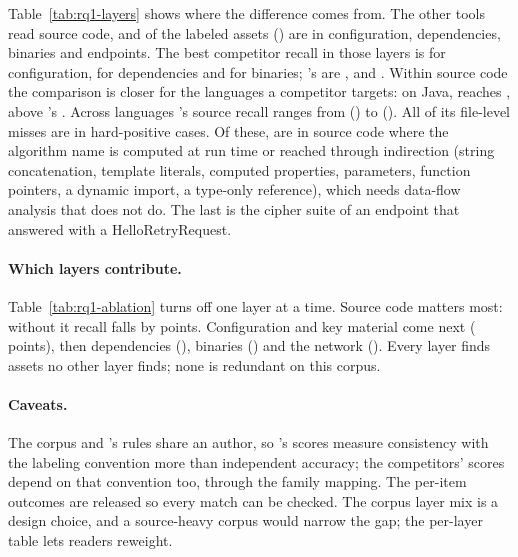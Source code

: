 Table~\ref{tab:rq1-layers} shows where the difference comes from. The other
tools read source code, and  of the labeled
assets () are in configuration, dependencies,
binaries and endpoints. The best competitor recall in those layers is
 for configuration,
 for dependencies and
 for binaries; \tool{}'s are
,  and
. Within source code the comparison is
closer for the languages a competitor targets: on Java,
 reaches ,
above \tool{}'s . Across languages \tool{}'s
source recall ranges from 
() to 
(). All  of its
file-level misses are in hard-positive cases. Of these,
 are in source code where the algorithm name
is computed at run time or reached through indirection (string concatenation,
template literals, computed properties, parameters, function pointers, a
dynamic import, a type-only reference), which needs data-flow analysis that
\tool{} does not do. The last is the cipher suite of an endpoint that
answered with a HelloRetryRequest.

\begin{table}[t]
\centering\small

\caption{Layer ablation for \tool{} at file level. $\Delta$R is the recall
lost, in percentage points, when one layer is turned off. The binary and
network rows match because each layer contributes exactly
 correctly found assets.}
\label{tab:rq1-ablation}
\end{table}

\paragraph{Which layers contribute.} Table~\ref{tab:rq1-ablation} turns off
one layer at a time. Source code matters most: without it recall falls by
 points. Configuration and key material
come next ( points), then dependencies
(), binaries
() and the network
(). Every layer finds assets no other
layer finds; none is redundant on this corpus.

\paragraph{Caveats.} The corpus and \tool{}'s rules share an author, so
\tool{}'s scores measure consistency with the labeling convention more than
independent accuracy; the competitors' scores depend on that convention too,
through the family mapping. The per-item outcomes are released so every
match can be checked. The corpus layer mix is a design choice, and a
source-heavy corpus would narrow the gap; the per-layer table lets readers
reweight.
